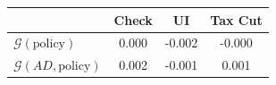 \begin{tabular}{@{}lccc@{}} 
\toprule 
                          & Check      & UI    & Tax Cut    \\  \midrule 
$\mathcal{G}(\text{policy})$ & 0.000  & -0.002  & -0.000     \\ 
$\mathcal{G}(AD,\text{policy})$ & 0.002  & -0.001  & 0.001     \\ 
\end{tabular}  
